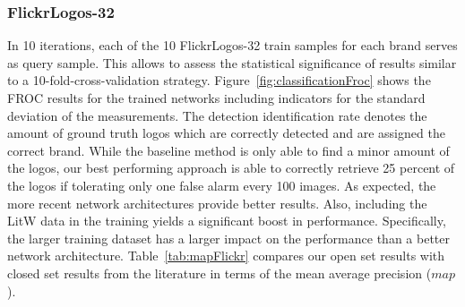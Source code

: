 \documentclass[a4paper,twoside]{article}
\newcommand{\map}{$\mathit{map}$}
\begin{document}
\subsubsection*{FlickrLogos-32}
\vspace*{-2.5mm}
In 10 iterations, each of the 10 FlickrLogos-32 train samples for each brand serves as query sample. This allows to assess the statistical significance of results similar to a 10-fold-cross-validation strategy. Figure~\ref{fig:classificationFroc} shows the FROC results for the trained networks including indicators for the standard deviation of the measurements. The detection identification rate denotes the amount of ground truth logos which are correctly detected and are assigned the correct brand.
While the baseline method is only able to find a minor amount of the logos, our best performing approach is able to correctly retrieve 25 percent of the logos if tolerating only one false alarm every 100 images.
As expected, the more recent network architectures provide better results. Also, including the \ac{LitW} data in the training yields a significant boost in performance. Specifically, the larger training dataset has a larger impact on the performance than a better network architecture. 
Table~\ref{tab:mapFlickr} compares our open set results with closed set results from the literature in terms of the mean average precision (\map). 
%
\end{document}
